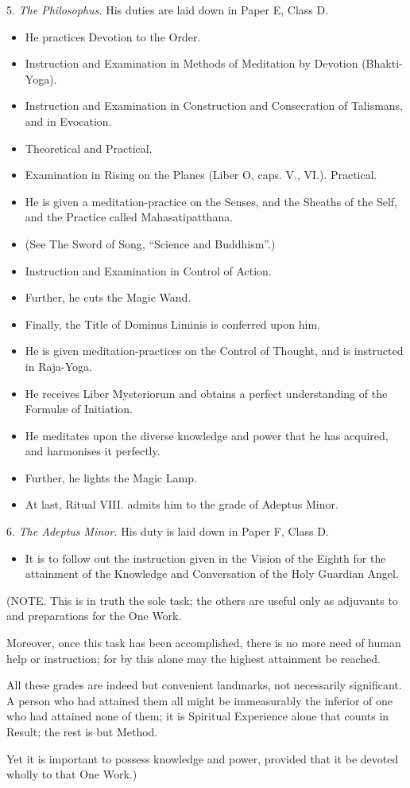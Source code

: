 5. \textit{The Philosophus.} His duties are laid down in Paper E, Class D.
\begin{itemize}
\item He practices Devotion to the Order.
\item Instruction and Examination in Methods of Meditation by Devotion (Bhakti-Yoga).
\item Instruction and Examination in Construction and Consecration of Talismans, and in Evocation.
\item Theoretical and Practical.
\item Examination in Rising on the Planes (Liber O, caps. V., VI.). Practical.
\item He is given a meditation-practice on the Senses, and the Sheaths of the Self, and the Practice called Mahasatipatthana.
\item (See The Sword of Song, \enquote{Science and Buddhism}.)
\item Instruction and Examination in Control of Action.
\item Further, he cuts the Magic Wand.
\item Finally, the Title of Dominus Liminis is conferred upon him.
\item He is given meditation-practices on the Control of Thought, and is instructed in Raja-Yoga.
\item He receives Liber Mysteriorum and obtains a perfect understanding of the Formul\ae{} of Initiation.
\item He meditates upon the diverse knowledge and power that he has acquired, and harmonises it perfectly.
\item Further, he lights the Magic Lamp.
\item At last, Ritual VIII. admits him to the grade of Adeptus Minor.
\end{itemize}

6. \textit{The Adeptus Minor.} His duty is laid down in Paper F, Class D.
\begin{itemize}[label={}]
\item It is to follow out the instruction given in the Vision of the Eighth \AEthyr{} for the attainment of the Knowledge and Conversation of the Holy Guardian Angel.
\end{itemize}

(NOTE. This is in truth the sole task; the others are useful only as adjuvants to and preparations for the One Work.

Moreover, once this task has been accomplished, there is no more need of human help or instruction; for by this alone may the highest attainment be reached.

All these grades are indeed but convenient landmarks, not necessarily significant. A person who had attained them all might be immeasurably the inferior of one who had attained none of them; it is Spiritual Experience alone that counts in Result; the rest is but Method.

Yet it is important to possess knowledge and power, provided that it be devoted wholly to that One Work.)
